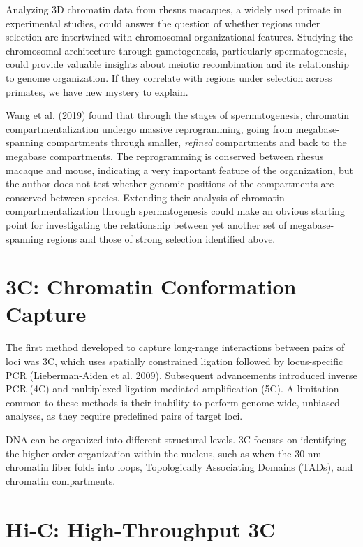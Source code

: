 \documentclass[
  11pt,
  a4paper,
]{scrbook}
\begin{document}
Analyzing 3D chromatin data from rhesus macaques, a widely used primate
in experimental studies, could answer the question of whether regions
under selection are intertwined with chromosomal organizational
features. Studying the chromosomal architecture through gametogenesis,
particularly spermatogenesis, could provide valuable insights about
meiotic recombination and its relationship to genome organization. If
they correlate with regions under selection across primates, we have new
mystery to explain.

Wang et al. (2019) found that through the stages of spermatogenesis,
chromatin compartmentalization undergo massive reprogramming, going from
megabase-spanning compartments through smaller, \emph{refined}
compartments and back to the megabase compartments. The reprogramming is
conserved between rhesus macaque and mouse, indicating a very important
feature of the organization, but the author does not test whether
genomic positions of the compartments are conserved between species.
Extending their analysis of chromatin compartmentalization through
spermatogenesis could make an obvious starting point for investigating
the relationship between yet another set of megabase-spanning regions
and those of strong selection identified above.

\section{3C: Chromatin Conformation
Capture}\label{c-chromatin-conformation-capture}

The first method developed to capture long-range interactions between
pairs of loci was 3C, which uses spatially constrained ligation followed
by locus-specific PCR (Lieberman-Aiden et al. 2009). Subsequent
advancements introduced inverse PCR (4C) and multiplexed
ligation-mediated amplification (5C). A limitation common to these
methods is their inability to perform genome-wide, unbiased analyses, as
they require predefined pairs of target loci.

DNA can be organized into different structural levels. 3C focuses on
identifying the higher-order organization within the nucleus, such as
when the 30 nm chromatin fiber folds into loops, Topologically
Associating Domains (TADs), and chromatin compartments.

\section{Hi-C: High-Throughput 3C}\label{hi-c-high-throughput-3c}
\end{document}
